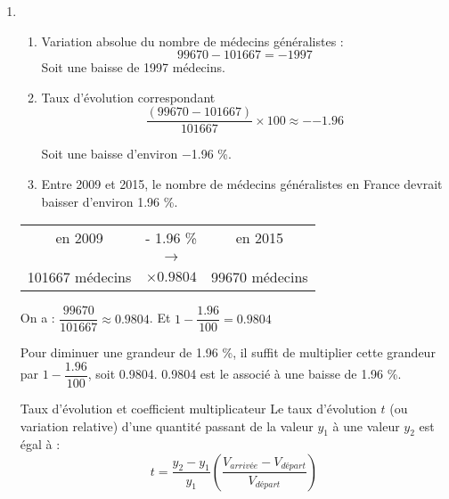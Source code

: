 \documentclass[12pt,a4paper]{article}
\begin{document}
\begin{enumerate}[label=\arabic*. ]
	\item \begin{enumerate}[label=\alph*)]
		\item Variation absolue du nombre de médecins généralistes :
		\begin{equation*}
			\num{99670} - \num{101667} = \num{-1997}
		\end{equation*}
		Soit une baisse de \num{1997} médecins.
		
		\item Taux d'évolution correspondant
			\begin{equation*}
				\dfrac{(\num{99670} - \num{101667})}{\num{101667}}\times 100 \approx -\num{-1.96}
			\end{equation*}
			
			Soit une baisse d'environ \num{-1.96} \%. 
			
		\item Entre \num{2009} et \num{2015}, le nombre de médecins généralistes en France devrait baisser d'environ \num{1.96} \%.
	\end{enumerate}
	
	\begin{myrem}
	
			
			
			\begin{tabular}{|ccc|}
				\hline
				en \num{2009} & - \num{1.96} \%  & en \num{2015} \\
									& {\LARGE $\rightarrow$} &			\\
				\num{101667} médecins& $\times \num{0.9804}$ & \num{99670} médecins \\
				\hline
			\end{tabular}

		\vspace*{1cm} 
		On a : $\dfrac{99670}{101667} \approx \num{0.9804}$.
		Et $1 - \dfrac{\num{1.96}}{\num{100}} = \num{0.9804}$
	
	
		Pour diminuer une grandeur de \num{1.96} \%, il suffit de multiplier cette grandeur par $1 - \dfrac{\num{1.96}}{\num{100}}$, soit \num{0.9804}. \num{0.9804} est le  associé à une baisse de \num{1.96} \%.
	\end{myrem}
	
	\begin{mybilan2}{Taux d'évolution et coefficient multiplicateur}
		Le taux d'évolution $t$ (ou variation relative) d'une quantité passant de la valeur $y_1$ à une valeur $y_2$ est égal à :
		\begin{equation*}
			t = \dfrac{y_2 - y_1}{y_1} \left(\dfrac{V_{arrivée} - V_{départ}}{V_{départ}}\right)
		\end{equation*}
		

\end{mybilan2}
\end{enumerate}
\end{document}
